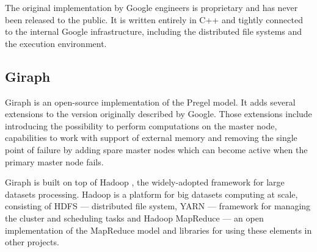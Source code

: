 The original implementation by Google engineers is proprietary and has never been released to the public. It is written entirely in C++ and tightly connected to the internal Google infrastructure, including the distributed file systems and the execution environment.

\subsection{Giraph}

Giraph \cite{giraph} is an open-source implementation of the Pregel model. It adds several extensions to the version originally described by Google. Those extensions include introducing the possibility to perform computations on the master node, capabilities to work with support of external memory and removing the single point of failure by adding spare master nodes which can become active when the primary master node fails.

Giraph is built on top of Hadoop \cite{hadoop}, the widely-adopted framework for large datasets processing. Hadoop is a platform for big datasets computing at scale, consisting of HDFS --- distributed file system, YARN --- framework for managing the cluster and scheduling tasks and Hadoop MapReduce --- an open implementation of the MapReduce model and libraries for using these elements in other projects.
 
